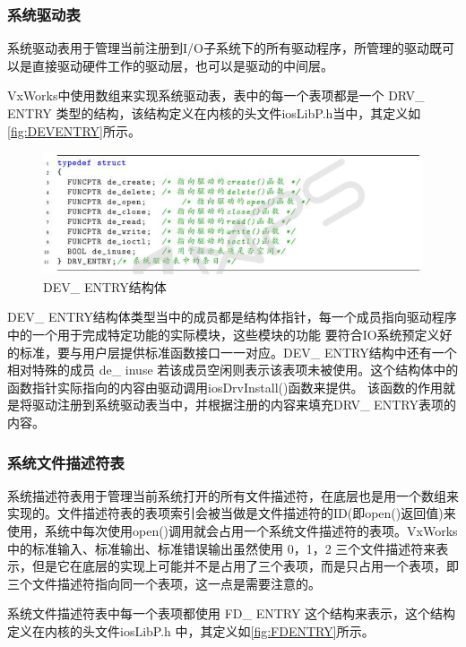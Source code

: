 \subsubsection{系统驱动表}	
	系统驱动表用于管理当前注册到I/O子系统下的所有驱动程序，所管理的驱动既可以是直接驱动硬件工作的驱动层，也可以是驱动的中间层\cite{VxWorks内核解读}。
	
	VxWorks中使用数组来实现系统驱动表，表中的每一个表项都是一个 DRV\_ ENTRY 类型的结构，该结构定义在内核的头文件iosLibP.h当中，其定义如\autoref{fig:DEVENTRY}所示。
	
\begin{figure}[!h]
\centering
\includegraphics[width=1.0\textwidth]{./graphics/DEVENTRY.pdf}
\caption{DEV\_ ENTRY结构体}\label{fig:DEVENTRY}
\end{figure}

DEV\_ ENTRY结构体类型当中的成员都是结构体指针，每一个成员指向驱动程序中的一个用于完成特定功能的实际模块，这些模块的功能 要符合IO系统预定义好的标准，要与用户层提供标准函数接口一一对应\cite{VxWorks内核解读}\cite{VxWorksDriverAPI}\cite{Wind2003VxWorks}。DEV\_ ENTRY结构中还有一个相对特殊的成员 de\_ inuse 若该成员空闲则表示该表项未被使用。这个结构体中的函数指针实际指向的内容由驱动调用iosDrvInstall()函数来提供。 该函数的作用就是将驱动注册到系统驱动表当中，并根据注册的内容来填充DRV\_ ENTRY表项的内容。


\subsubsection{系统文件描述符表}
	系统描述符表用于管理当前系统打开的所有文件描述符，在底层也是用一个数组来实现的。文件描述符表的表项索引会被当做是文件描述符的ID(即open()返回值)来使用，系统中每次使用open()调用就会占用一个系统文件描述符的表项。VxWorks中的标准输入、标准输出、标准错误输出虽然使用 0，1，2 三个文件描述符来表示，但是它在底层的实现上可能并不是占用了三个表项，而是只占用一个表项，即三个文件描述符指向同一个表项\cite{VxWorks内核解读}\cite{An2003Implementation}，这一点是需要注意的。
		
	
系统文件描述符表中每一个表项都使用 FD\_ ENTRY 这个结构来表示，这个结构定义在内核的头文件iosLibP.h 中，其定义如\autoref{fig:FDENTRY}所示。


